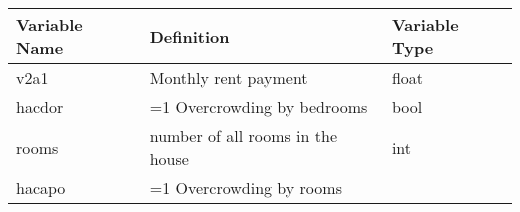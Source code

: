 \documentclass[11pt]{article}
\begin{document}
\begin{longtable}[]{@{}lll@{}}
\toprule
\begin{minipage}[b]{0.19\columnwidth}\raggedright\strut
Variable Name\strut
\end{minipage} & \begin{minipage}[b]{0.16\columnwidth}\raggedright\strut
Definition\strut
\end{minipage} & \begin{minipage}[b]{0.24\columnwidth}\raggedright\strut
Variable Type\strut
\end{minipage}\tabularnewline
\midrule
\endhead
\begin{minipage}[t]{0.19\columnwidth}\raggedright\strut
v2a1\strut
\end{minipage} & \begin{minipage}[t]{0.16\columnwidth}\raggedright\strut
Monthly rent payment\strut
\end{minipage} & \begin{minipage}[t]{0.24\columnwidth}\raggedright\strut
float\strut
\end{minipage}\tabularnewline
\begin{minipage}[t]{0.19\columnwidth}\raggedright\strut
hacdor\strut
\end{minipage} & \begin{minipage}[t]{0.16\columnwidth}\raggedright\strut
=1 Overcrowding by bedrooms\strut
\end{minipage} & \begin{minipage}[t]{0.24\columnwidth}\raggedright\strut
bool\strut
\end{minipage}\tabularnewline
\begin{minipage}[t]{0.19\columnwidth}\raggedright\strut
rooms\strut
\end{minipage} & \begin{minipage}[t]{0.16\columnwidth}\raggedright\strut
number of all rooms in the house\strut
\end{minipage} & \begin{minipage}[t]{0.24\columnwidth}\raggedright\strut
int\strut
\end{minipage}\tabularnewline
\begin{minipage}[t]{0.19\columnwidth}\raggedright\strut
hacapo\strut
\end{minipage} & \begin{minipage}[t]{0.16\columnwidth}\raggedright\strut
=1 Overcrowding by rooms\strut
\end{minipage} & \begin{minipage}[t]{0.24\columnwidth}\raggedright\strut

\end{minipage}
\end{longtable}
\end{document}
